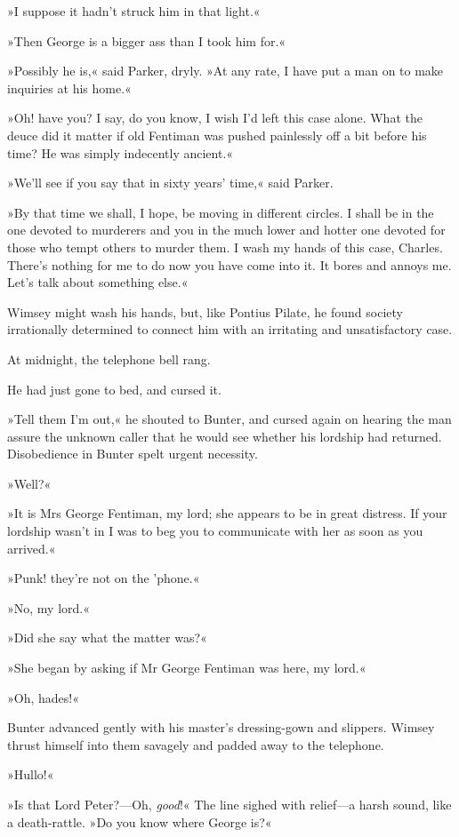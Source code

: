 »I suppose it hadn't struck him in that light.«

»Then George is a bigger ass than I took him for.«

»Possibly he is,« said Parker, dryly. »At any rate, I have put a man on to make inquiries at his home.«

»Oh! have you? I say, do you know, I wish I'd left this case alone. What the deuce did it matter if old Fentiman was pushed painlessly off a bit before his time? He was simply indecently ancient.«

»We'll see if you say that in sixty years' time,« said Parker.

»By that time we shall, I hope, be moving in different circles. I shall be in the one devoted to murderers and you in the much lower and hotter one devoted for those who tempt others to murder them. I wash my hands of this case, Charles. There's nothing for me to do now you have come into it. It bores and annoys me. Let's talk about something else.«

Wimsey might wash his hands, but, like Pontius Pilate, he found society irrationally determined to connect him with an irritating and unsatisfactory case.

At midnight, the telephone bell rang.

He had just gone to bed, and cursed it.

»Tell them I'm out,« he shouted to Bunter, and cursed again on hearing the man assure the unknown caller that he would see whether his lordship had returned. Disobedience in Bunter spelt urgent necessity.

»Well?«

»It is Mrs George Fentiman, my lord; she appears to be in great distress. If your lordship wasn't in I was to beg you to communicate with her as soon as you arrived.«

»Punk! they're not on the 'phone.«

»No, my lord.«

»Did she say what the matter was?«

»She began by asking if Mr George Fentiman was here, my lord.«

»Oh, hades!«

Bunter advanced gently with his master's dressing-gown and slippers. Wimsey thrust himself into them savagely and padded away to the telephone.

»Hullo!«

»Is that Lord Peter?—Oh, \textit{good}!« The line sighed with relief—a harsh sound, like a death-rattle. »Do you know where George is?«

